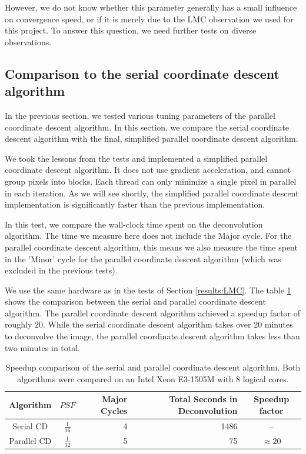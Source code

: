 However, we do not know whether this parameter generally has a small influence on convergence speed, or if it is merely due to the LMC observation we used for this project. To answer this question, we need further tests on diverse observations.


\subsection{Comparison to the serial coordinate descent algorithm}
In the previous section, we tested various tuning parameters of the parallel coordinate descent algorithm. In this section, we compare the serial coordinate descent algorithm with the final, simplified parallel coordinate descent algorithm.

We took the lessons from the tests and implemented a simplified parallel coordinate descent algorithm. It does not use gradient acceleration, and cannot group pixels into blocks. Each thread can only minimize a single pixel in parallel in each iteration. As we will see shortly, the simplified parallel coordinate descent implementation is significantly faster than the previous implementation.

In this test, we compare the wall-clock time spent on the deconvolution algorithm. The time we measure here does not include the Major cycle. For the parallel coordinate descent algorithm, this means we also measure the time spent in the 'Minor' cycle for the parallel coordinate descent algorithm (which was excluded in the previous tests).

We use the same hardware as in the tests of Section \ref{results:LMC}. The table \ref{pcdm:comp:table} shows the comparison between the serial and parallel coordinate descent algorithm. The parallel coordinate descent algorithm achieved a speedup factor of roughly $20$. While the serial coordinate descent algorithm takes over 20 minutes to deconvolve the image, the parallel coordinate descent algorithm takes less than two minutes in total.

\begin{table} [h]
	\centering
	\begin{tabular}{c | c | r | r | c}
		Algorithm &  $PSF$  & Major Cycles & Total Seconds in Deconvolution & Speedup factor\\ \hline
		Serial CD & $\frac{1}{16}$ & 4 & 1486 & --\\
		Parallel CD & $\frac{1}{32}$ & 5 & 75 & $\approx 20$ \\
	\end{tabular}
	\caption{Speedup comparison of the serial and parallel coordinate descent algorithm. Both algorithms were compared on an Intel Xeon E3-1505M with 8 logical cores.}
	\label{pcdm:comp:table}
\end{table}

